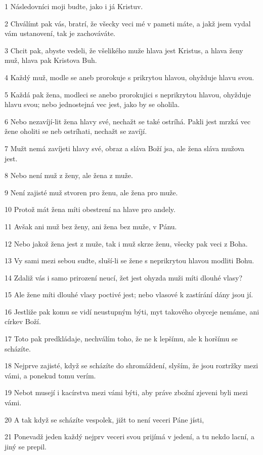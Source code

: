 \par 1 Následovníci moji budte, jako i já Kristuv.
\par 2 Chválímt pak vás, bratrí, že všecky veci mé v pameti máte, a jakž jsem vydal vám ustanovení, tak je zachováváte.
\par 3 Chcit pak, abyste vedeli, že všelikého muže hlava jest Kristus, a hlava ženy muž, hlava pak Kristova Buh.
\par 4 Každý muž, modle se aneb prorokuje s prikrytou hlavou, ohyžduje hlavu svou.
\par 5 Každá pak žena, modleci se anebo prorokujici s neprikrytou hlavou, ohyžduje hlavu svou; nebo jednostejná vec jest, jako by se oholila.
\par 6 Nebo nezavíjí-lit žena hlavy své, nechažt se také ostríhá. Pakli jest mrzká vec žene oholiti se neb ostríhati, nechažt se zavíjí.
\par 7 Mužt nemá zavíjeti hlavy své, obraz a sláva Boží jsa, ale žena sláva mužova jest.
\par 8 Nebo není muž z ženy, ale žena z muže.
\par 9 Není zajisté muž stvoren pro ženu, ale žena pro muže.
\par 10 Protož mát žena míti obestrení na hlave pro andely.
\par 11 Avšak ani muž bez ženy, ani žena bez muže, v Pánu.
\par 12 Nebo jakož žena jest z muže, tak i muž skrze ženu, všecky pak veci z Boha.
\par 13 Vy sami mezi sebou sudte, sluší-li se žene s neprikrytou hlavou modliti Bohu.
\par 14 Zdaliž vás i samo prirození neucí, žet jest ohyzda muži míti dlouhé vlasy?
\par 15 Ale žene míti dlouhé vlasy poctivé jest; nebo vlasové k zastírání dány jsou jí.
\par 16 Jestliže pak komu se vidí neustupným býti, myt takového obyceje nemáme, ani církev Boží.
\par 17 Toto pak predkládaje, nechválím toho, že ne k lepšímu, ale k horšímu se scházíte.
\par 18 Nejprve zajisté, když se scházíte do shromáždení, slyším, že jsou roztržky mezi vámi, a ponekud tomu verím.
\par 19 Nebot musejí i kacírstva mezi vámi býti, aby práve zbožní zjeveni byli mezi vámi.
\par 20 A tak když se scházíte vespolek, jižt to není veceri Páne jísti,
\par 21 Ponevadž jeden každý nejprv veceri svou prijímá v jedení, a tu nekdo lacní, a jiný se prepil.
